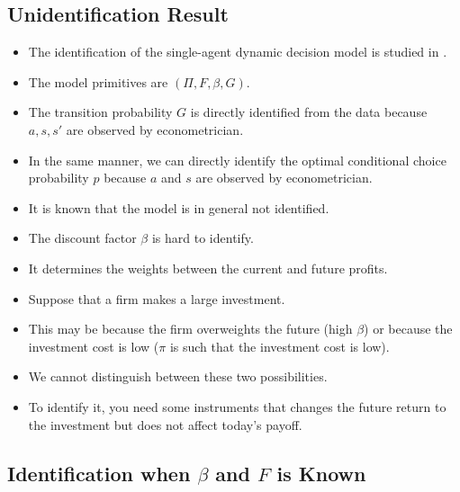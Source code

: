 \documentclass[]{book}
\providecommand{\tightlist}{%
  \setlength{\itemsep}{0pt}\setlength{\parskip}{0pt}}
\begin{document}
\subsection{Unidentification Result}\label{unidentification-result}

\begin{itemize}
\tightlist
\item
  The identification of the single-agent dynamic decision model is
  studied in \citet{magnacIdentifyingDynamicDiscrete2002}.
\item
  The model primitives are \((\Pi, F, \beta, G)\).
\item
  The transition probability \(G\) is directly identified from the data
  because \(a, s, s'\) are observed by econometrician.
\item
  In the same manner, we can directly identify the optimal conditional
  choice probability \(p\) because \(a\) and \(s\) are observed by
  econometrician.
\item
  It is known that the model is in general not identified.
\item
  The discount factor \(\beta\) is hard to identify.
\item
  It determines the weights between the current and future profits.
\item
  Suppose that a firm makes a large investment.
\item
  This may be because the firm overweights the future (high \(\beta\))
  or because the investment cost is low (\(\pi\) is such that the
  investment cost is low).
\item
  We cannot distinguish between these two possibilities.
\item
  To identify it, you need some instruments that changes the future
  return to the investment but does not affect today's payoff.
\end{itemize}

\subsection{\texorpdfstring{Identification when \(\beta\) and \(F\) is
Known}{Identification when \textbackslash{}beta and F is Known}}\label{identification-when-beta-and-f-is-known}
\end{document}
